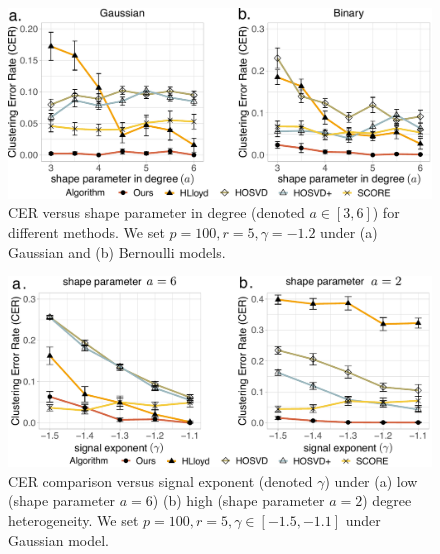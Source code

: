 \documentclass[lettersize,onecolumn,journal]{IEEEtran}
\theoremstyle{definition}
\theoremstyle{definition}
\providecommand{\DIFdelbegin}{} %
\providecommand{\DIFdelend}{} %
\newcommand{\DIFscaledelfig}{0.5}
\newlength{\DIFdelgraphicswidth} %
\newlength{\DIFdelgraphicsheight} %
\newcommand{\DIFdelincludegraphics}[2][]{%
\sbox{\DIFdelgraphicsbox}{\DIFOincludegraphics[#1]{#2}}%
\settoboxwidth{\DIFdelgraphicswidth}{\DIFdelgraphicsbox} %
\settoboxtotalheight{\DIFdelgraphicsheight}{\DIFdelgraphicsbox} %
\scalebox{\DIFscaledelfig}{%
\parbox[b]{\DIFdelgraphicswidth}{\usebox{\DIFdelgraphicsbox}\\[-\baselineskip] \rule{\DIFdelgraphicswidth}{0em}}\llap{\resizebox{\DIFdelgraphicswidth}{\DIFdelgraphicsheight}{%
\setlength{\unitlength}{\DIFdelgraphicswidth}%
\begin{picture}(1,1)%
\thicklines\linethickness{2pt} %
{\color[rgb]{1,0,0}\put(0,0){\framebox(1,1){}}}%
{\color[rgb]{1,0,0}\put(0,0){\line( 1,1){1}}}%
{\color[rgb]{1,0,0}\put(0,1){\line(1,-1){1}}}%
\end{picture}%
}\hspace*{3pt}}} %
} %
\DeclareRobustCommand{\DIFdelbegin}{\DIFOdelbegin \let\includegraphics\DIFdelincludegraphics} %
\DeclareRobustCommand{\DIFdelend}{\DIFOaddend \let\includegraphics\DIFOincludegraphics} %
\begin{document}
\DIFdelbegin %

\DIFdelend \begin{figure}[h!]
    \centering
    \includegraphics[width=.8\columnwidth]{comp_theta_anno3.pdf}
    \caption{CER versus shape parameter in degree (denoted $a\in[3,6]$) for different methods. We set $p = 100, r = 5, \gamma = -1.2$ under (a) Gaussian and (b) Bernoulli models.}
    \label{fig:comp_theta}
\end{figure}



\begin{figure}[htp!]
    \centering
    \includegraphics[width=.8\columnwidth]{comp_gamma_theta3.pdf}
    \caption{CER comparison versus signal exponent (denoted $\gamma$) under (a) low (shape parameter $a = 6$)  (b) high (shape parameter $a = 2$) degree heterogeneity. We set $p = 100, r = 5, \gamma \in [-1.5, -1.1]$ under Gaussian model.}
    \label{fig:comp_gamma_theta}
\end{figure}
\end{document}
